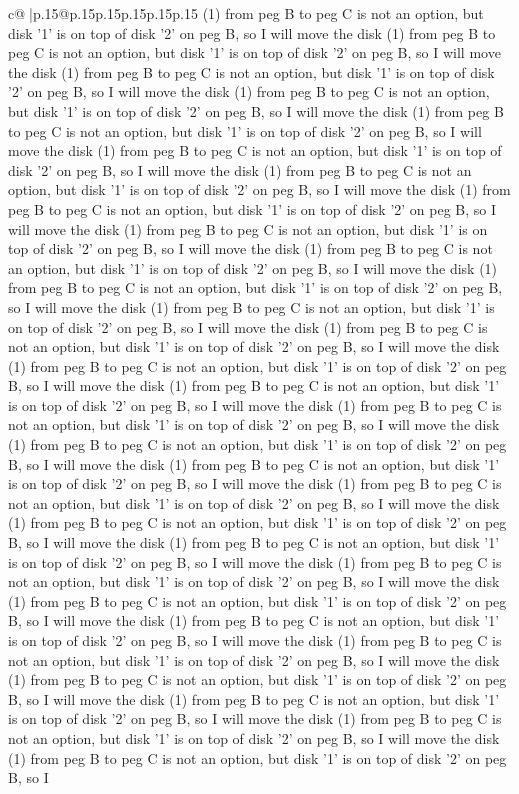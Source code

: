 \documentclass{article}
\begin{document}
{\begin{supertabular}{c@{$\;$}|p{.15\linewidth}@{}p{.15\linewidth}p{.15\linewidth}p{.15\linewidth}p{.15\linewidth}p{.15\linewidth}}
{{{(1) from peg B to peg C is not an option, but disk '1' is on top of disk '2' on peg B, so I will move the disk (1) from peg B to peg C is not an option, but disk '1' is on top of disk '2' on peg B, so I will move the disk (1) from peg B to peg C is not an option, but disk '1' is on top of disk '2' on peg B, so I will move the disk (1) from peg B to peg C is not an option, but disk '1' is on top of disk '2' on peg B, so I will move the disk (1) from peg B to peg C is not an option, but disk '1' is on top of disk '2' on peg B, so I will move the disk (1) from peg B to peg C is not an option, but disk '1' is on top of disk '2' on peg B, so I will move the disk (1) from peg B to peg C is not an option, but disk '1' is on top of disk '2' on peg B, so I will move the disk (1) from peg B to peg C is not an option, but disk '1' is on top of disk '2' on peg B, so I will move the disk (1) from peg B to peg C is not an option, but disk '1' is on top of disk '2' on peg B, so I will move the disk (1) from peg B to peg C is not an option, but disk '1' is on top of disk '2' on peg B, so I will move the disk (1) from peg B to peg C is not an option, but disk '1' is on top of disk '2' on peg B, so I will move the disk (1) from peg B to peg C is not an option, but disk '1' is on top of disk '2' on peg B, so I will move the disk (1) from peg B to peg C is not an option, but disk '1' is on top of disk '2' on peg B, so I will move the disk (1) from peg B to peg C is not an option, but disk '1' is on top of disk '2' on peg B, so I will move the disk (1) from peg B to peg C is not an option, but disk '1' is on top of disk '2' on peg B, so I will move the disk (1) from peg B to peg C is not an option, but disk '1' is on top of disk '2' on peg B, so I will move the disk (1) from peg B to peg C is not an option, but disk '1' is on top of disk '2' on peg B, so I will move the disk (1) from peg B to peg C is not an option, but disk '1' is on top of disk '2' on peg B, so I will move the disk (1) from peg B to peg C is not an option, but disk '1' is on top of disk '2' on peg B, so I will move the disk (1) from peg B to peg C is not an option, but disk '1' is on top of disk '2' on peg B, so I will move the disk (1) from peg B to peg C is not an option, but disk '1' is on top of disk '2' on peg B, so I will move the disk (1) from peg B to peg C is not an option, but disk '1' is on top of disk '2' on peg B, so I will move the disk (1) from peg B to peg C is not an option, but disk '1' is on top of disk '2' on peg B, so I will move the disk (1) from peg B to peg C is not an option, but disk '1' is on top of disk '2' on peg B, so I will move the disk (1) from peg B to peg C is not an option, but disk '1' is on top of disk '2' on peg B, so I will move the disk (1) from peg B to peg C is not an option, but disk '1' is on top of disk '2' on peg B, so I will move the disk (1) from peg B to peg C is not an option, but disk '1' is on top of disk '2' on peg B, so I will move the disk (1) from peg B to peg C is not an option, but disk '1' is on top of disk '2' on peg B, so I will move the disk (1) from peg B to peg C is not an option, but disk '1' is on top of disk '2' on peg B, so I }}}
\end{supertabular}}
\end{document}

